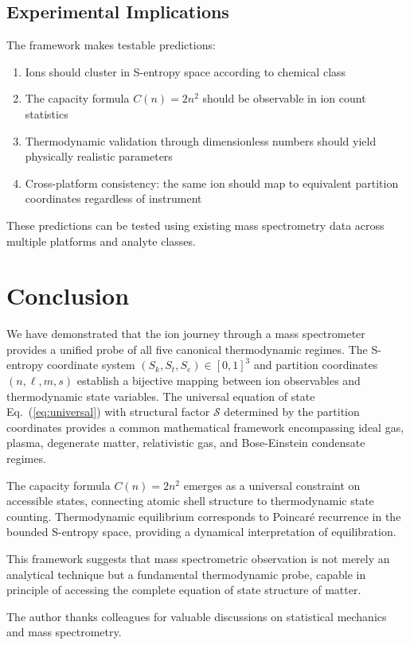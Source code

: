 \documentclass[twocolumn,aps,prd,superscriptaddress,nofootinbib]{revtex4-2}
\newcommand{\Sk}{S_k}
\newcommand{\St}{S_t}
\newcommand{\Se}{S_e}
\begin{document}
\subsection{Experimental Implications}

The framework makes testable predictions:
\begin{enumerate}
    \item Ions should cluster in S-entropy space according to chemical class
    \item The capacity formula $C(n) = 2n^2$ should be observable in ion count statistics
    \item Thermodynamic validation through dimensionless numbers should yield physically realistic parameters
    \item Cross-platform consistency: the same ion should map to equivalent partition coordinates regardless of instrument
\end{enumerate}

These predictions can be tested using existing mass spectrometry data across multiple platforms and analyte classes.

\section{Conclusion}

We have demonstrated that the ion journey through a mass spectrometer provides a unified probe of all five canonical thermodynamic regimes. The S-entropy coordinate system $(\Sk, \St, \Se) \in [0,1]^3$ and partition coordinates $(n, \ell, m, s)$ establish a bijective mapping between ion observables and thermodynamic state variables. The universal equation of state Eq.~(\ref{eq:universal}) with structural factor $\mathcal{S}$ determined by the partition coordinates provides a common mathematical framework encompassing ideal gas, plasma, degenerate matter, relativistic gas, and Bose-Einstein condensate regimes.

The capacity formula $C(n) = 2n^2$ emerges as a universal constraint on accessible states, connecting atomic shell structure to thermodynamic state counting. Thermodynamic equilibrium corresponds to Poincar\'{e} recurrence in the bounded S-entropy space, providing a dynamical interpretation of equilibration.

This framework suggests that mass spectrometric observation is not merely an analytical technique but a fundamental thermodynamic probe, capable in principle of accessing the complete equation of state structure of matter.

\begin{acknowledgments}
The author thanks colleagues for valuable discussions on statistical mechanics and mass spectrometry.
\end{acknowledgments}


\end{document}
